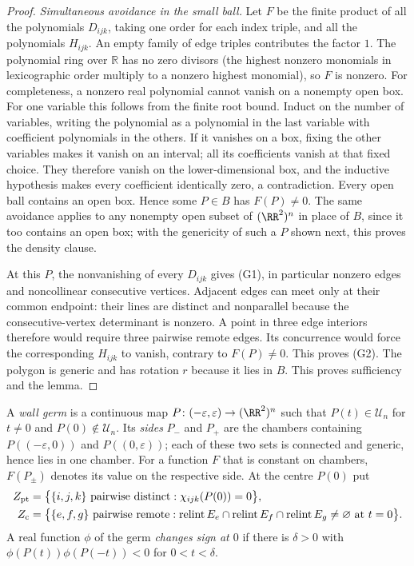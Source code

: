 \begin{proof}
\emph{Simultaneous avoidance in the small ball.}
Let $F$ be the finite product of all the polynomials $D_{ijk}$, taking
one order for each index triple, and all the polynomials $H_{ijk}$.
An empty family of edge triples contributes the factor $1$.
The polynomial ring over $\mathbb R$ has no zero divisors (the highest
nonzero monomials in lexicographic order multiply to a nonzero highest
monomial), so $F$ is nonzero.
For completeness, a nonzero real polynomial cannot vanish on a
nonempty open box. For one variable this follows from the finite root
bound. Induct on the number of variables, writing the polynomial as a
polynomial in the last variable with coefficient polynomials in the
others. If it vanishes on a box, fixing the other variables makes it
vanish on an interval; all its coefficients vanish at that fixed
choice. They therefore vanish on the lower-dimensional box, and the
inductive hypothesis makes every coefficient identically zero, a
contradiction. Every open ball contains an open box. Hence some
$P\in B$ has $F(P)\ne0$. The same avoidance applies to any nonempty open
subset of $(\RR^2)^n$ in place of $B$, since it too contains an open box;
with the genericity of such a $P$ shown next, this proves the density clause.

At this $P$, the nonvanishing of every $D_{ijk}$ gives (G1), in
particular nonzero edges and noncollinear consecutive vertices.
Adjacent edges can meet only at their common endpoint: their lines
are distinct and nonparallel because the consecutive-vertex
determinant is nonzero. A point in three edge interiors therefore
would require three pairwise remote edges. Its concurrence would
force the corresponding $H_{ijk}$ to vanish, contrary to $F(P)\ne0$.
This proves (G2). The polygon is generic and has rotation $r$ because
it lies in $B$. This proves sufficiency and the lemma.
\end{proof}

\begin{definition}\label{def:germ}\leanok
A \emph{wall germ} is a continuous map $P\colon(-\varepsilon,\varepsilon)\to
(\RR^2)^n$ such that $P(t)\in\mathcal U_n$ for $t\neq0$ and $P(0)\notin
\mathcal U_n$. Its \emph{sides} $P_-$ and $P_+$ are the chambers containing
$P((-\varepsilon,0))$ and $P((0,\varepsilon))$; each of these two sets is
connected and generic, hence lies in one chamber. For a function $F$ that is
constant on chambers, $F(P_\pm)$ denotes its value on the respective side.
At the centre $P(0)$ put
\begin{align*}
Z_{\rm pt}&=\bigl\{\{i,j,k\}\text{ pairwise distinct}:\chi_{ijk}(P(0))=0\bigr\},\\
Z_{\rm c}&=\bigl\{\{e,f,g\}\text{ pairwise remote}:
\operatorname{relint}E_e\cap\operatorname{relint}E_f\cap\operatorname{relint}E_g\neq\varnothing\text{ at }t=0\bigr\}.
\end{align*}
A real function $\phi$ of the germ \emph{changes sign at $0$} if there is
$\delta>0$ with $\phi(P(t))\phi(P(-t))<0$ for $0<t<\delta$.
\end{definition}

